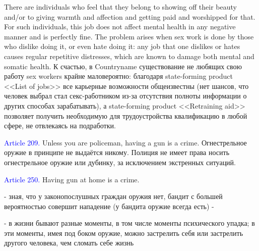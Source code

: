 \documentclass[11pt]{article}
\theoremstyle{remark}
\theoremstyle{definition}
\begin{document}
There are individuals who feel that they belong to showing off their beauty and/or to giving warmth and affection and getting paid and worshipped for that. For such individuals, this job does not affect mental health in any negative manner and is perfectly fine. The problem arises when sex work is done by those who dislike doing it, or even hate doing it: any job that one dislikes or hates causes regular repetitive distresses, which are known to damage both mental and somatic health. К счастью, в Countryname существование не любящих свою работу sex workers крайне маловероятно: благодаря state-forming product <<List of jobs>> все карьерные возможности общеизвестны (нет шансов, что человек выбрал стал секс-работником из-за отсутствия полноты информации о других способах зарабатывать), а state-forming product <<Retraining aid>> позволяет получить необходимую для трудоустройства квалификацию в любой сфере, не отвлекаясь на подработки. 












\color{black}

\textcolor{blue}{Article 209.} Unless you are policeman, having a gun is a crime. Огнестрельное оружие в принципе не выдаётся никому. Полиция не имеет права носить огнестрельное оружие или дубинку, за исключением экстренных ситуаций.

\textcolor{blue}{Article 250.} Having gun at home is a crime.


- зная, что у законопослушных граждан оружия нет, бандит с большей вероятностью совершит нападение (у бандита оружие всегда есть) 
-


- в жизни бывают разные моменты, в том числе моменты психического упадка; в эти моменты, имея под боком оружие, можно застрелить себя или застрелить другого человека, чем сломать себе жизнь
\end{document}
